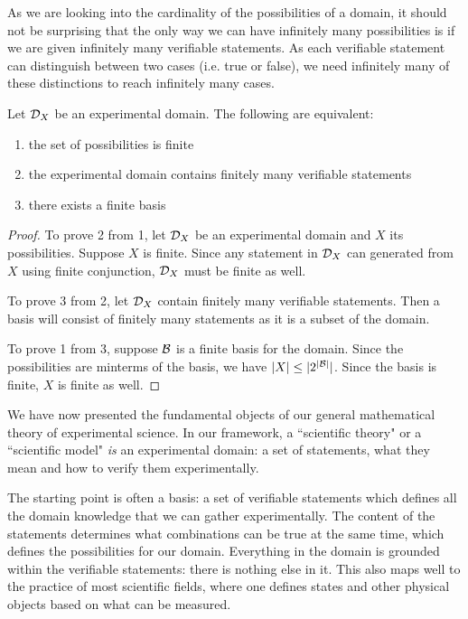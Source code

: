 \documentclass[11pt,letterpaper,fleqn]{memoir} %
\begin{document}
As we are looking into the cardinality of the possibilities of a domain, it should not be surprising that the only way we can have infinitely many possibilities is if we are given infinitely many verifiable statements. As each verifiable statement can distinguish between two cases (i.e. true or false), we need infinitely many of these distinctions to reach infinitely many cases.

\begin{mathSection}
\begin{prop}
	Let $\mathcal{D}_X$ be an experimental domain. The following are equivalent:
	\begin{enumerate}
		\item the set of possibilities is finite
		\item the experimental domain contains finitely many verifiable statements
		\item there exists a finite basis
	\end{enumerate}
\end{prop}
\begin{proof}
	To prove 2 from 1, let $\mathcal{D}_X$ be an experimental domain and $X$ its possibilities. Suppose $X$ is finite. Since any statement in $\mathcal{D}_X$ can generated from $X$ using finite conjunction, $\mathcal{D}_X$ must be finite as well.
	
	To prove 3 from 2, let $\mathcal{D}_X$ contain finitely many verifiable statements. Then a basis will consist of finitely many statements as it is a subset of the domain.
	
	To prove 1 from 3, suppose $\mathcal{B}$ is a finite basis for the domain. Since the possibilities are minterms of the basis, we have $|X| \leq |2^{|\mathcal{B}|}|$. Since the basis is finite, $X$ is finite as well.
\end{proof}
\end{mathSection}

We have now presented the fundamental objects of our general mathematical theory of experimental science. In our framework, a ``scientific theory" or a ``scientific model" \emph{is} an experimental domain: a set of statements, what they mean and how to verify them experimentally.

The starting point is often a basis: a set of verifiable statements which defines all the domain knowledge that we can gather experimentally. The content of the statements determines what combinations can be true at the same time, which defines the possibilities for our domain. Everything in the domain is grounded within the verifiable statements: there is nothing else in it. This also maps well to the practice of most scientific fields, where one defines states and other physical objects based on what can be measured.
\end{document}
